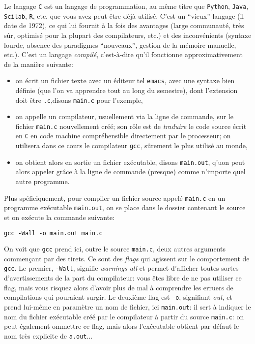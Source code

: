 \documentclass[10pt,french,a4paper]{article}
\theoremstyle{definition}
\theoremstyle{remark}
\newcommand{\shell}[1]{\lstinline[style=sh]|#1|}
\begin{document}
Le langage \shell{C} est un langage de programmation, au même titre
que \shell{Python}, \shell{Java}, \shell{Scilab}, \shell{R}, etc. que
vous avez peut-être déjà utilisé. C'est un ``vieux'' langage (il date
de 1972), ce qui lui fournit à la fois des avantages (large
communauté, très sûr, optimisé pour la plupart des compilateurs, etc.)
et des inconvénients (syntaxe lourde, absence des paradigmes
``nouveaux'', gestion de la mémoire manuelle, etc.). C'est un langage
{\em compilé}, c'est-à-dire qu'il fonctionne approximativement de la
manière suivante:
\begin{itemize}
\item on écrit un fichier texte avec un éditeur tel \shell{emacs},
  avec une syntaxe bien définie (que l'on va apprendre tout au long du
  semestre), dont l'extension doit être \shell{.c},disons
  \shell{main.c} pour l'exemple,
\item on appelle un compilateur, usuellement via la ligne de commande,
  sur le fichier \shell{main.c} nouvellement créé; son rôle est de
  {\em traduire} le code source écrit en \shell{C} en code machine
  compréhensible directement par le processeur; on utilisera dans ce
  cours le compilateur \shell{gcc}, sûrement le plus utilisé au monde,
\item on obtient alors en sortie un fichier exécutable, disons
  \shell{main.out}, q'uon peut alors appeler grâce à la ligne de
  commande (presque) comme n'importe quel autre programme.
\end{itemize}

Plus spéficiquement, pour compiler un fichier source appelé
\shell{main.c} en un programme exécutable \shell{main.out}, on se
place dans le dossier contenant le source et on exécute la commande
suivante:
\begin{lstlisting}[style=sh]
  gcc -Wall -o main.out main.c
\end{lstlisting}
On voit que \shell{gcc} prend ici, outre le source \shell{main.c},
deux autres arguments commençant par des tirets. Ce sont des {\em
  flags} qui agissent sur le comportement de \shell{gcc}. Le premier,
\shell{-Wall}, signifie {\em warnings all} et permet d'afficher toutes
sortes d'avertissements de la part du compilateur: vous êtes libre de
ne pas utiliser ce flag, mais vous risquez alors d'avoir plus de mal à
comprendre les erruers de compilations qui pouraient surgir. Le
deuxième flag est \shell{-o}, signifiant {\em out}, et prend lui-même
en paramètre un nom de fichier, ici \shell{main.out}: il sert à
indiquer le nom du fichier exécutable créé par le compilateur à partir
du source \shell{main.c}: on peut également ommettre ce flag, mais
alors l'exécutable obtient par défaut le nom très explicite de
\shell{a.out}...
\end{document}
